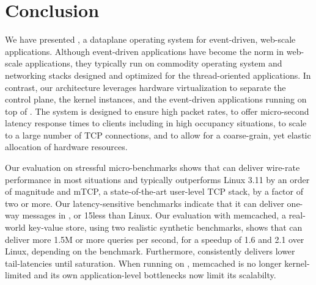 
\section{Conclusion}

We have presented \ix, a dataplane operating system for event-driven,
web-scale applications.  Although event-driven applications have
become the norm in web-scale applications, they typically run on
commodity operating system and networking stacks designed and
optimized for the thread-oriented applications.  In contrast, our
architecture leverages hardware virtualization to separate the control
plane, the \ix kernel instances, and the event-driven applications
running on top of \ix.  The system is designed to ensure high packet
rates, to offer micro-second latency response times to clients
including in high occupancy situations, to scale to a large number of 
TCP connections, and to allow for a coarse-grain, yet
elastic allocation of hardware resources.

Our evaluation on stressful micro-benchmarks shows that \ix can
deliver wire-rate performance in most situations and typically
outperforms Linux 3.11 by an order of magnitude and mTCP, a
state-of-the-art user-level TCP stack, by a factor of two or more. Our
latency-sensitive benchmarks indicate that it can deliver one-way
messages in \microsecond, or 15\microsecond less than
Linux.  Our evaluation with memcached, a real-world key-value store,
using two realistic synthetic benchmarks, shows that \ix can deliver
more 1.5M or more queries per second, for a speedup of 1.6 and 2.1
over Linux, depending on the benchmark.  Furthermore, \ix consistently
delivers lower tail-latencies until saturation.  When running on \ix,
memcached is no longer kernel-limited and its own application-level
bottlenecks now limit its scalabilty.


